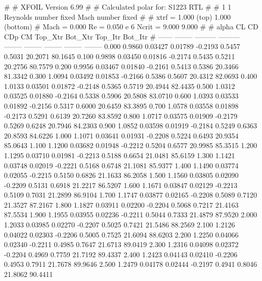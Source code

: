 #  
#       XFOIL         Version 6.99
#  
# Calculated polar for: S1223 RTL                                       
#  
# 1 1 Reynolds number fixed          Mach number fixed         
#  
# xtrf =   1.000 (top)        1.000 (bottom)  
# Mach =   0.000     Re =     0.050 e 6     Ncrit =   9.000  9.000
#  
#   alpha    CL        CD       CDp       CM     Top_Xtr  Bot_Xtr  Top_Itr  Bot_Itr
#  ------ -------- --------- --------- -------- -------- -------- -------- --------
   0.000   0.9860   0.03427   0.01789  -0.2193   0.5457   0.5031  20.2071  80.1645
   0.100   0.9898   0.03450   0.01816  -0.2174   0.5435   0.5211  20.2756  80.7579
   0.200   0.9956   0.03467   0.01840  -0.2161   0.5413   0.5386  20.3466  81.3342
   0.300   1.0094   0.03492   0.01853  -0.2166   0.5386   0.5607  20.4312  82.0693
   0.400   1.0133   0.03501   0.01872  -0.2148   0.5365   0.5719  20.4944  82.4435
   0.500   1.0312   0.03525   0.01880  -0.2164   0.5338   0.5906  20.5808  83.0710
   0.600   1.0393   0.03533   0.01892  -0.2156   0.5317   0.6000  20.6459  83.3895
   0.700   1.0578   0.03558   0.01898  -0.2173   0.5291   0.6139  20.7260  83.8592
   0.800   1.0717   0.03575   0.01909  -0.2179   0.5269   0.6248  20.7946  84.2303
   0.900   1.0852   0.03598   0.01919  -0.2184   0.5249   0.6363  20.8593  84.6226
   1.000   1.1071   0.03641   0.01931  -0.2208   0.5224   0.6493  20.9354  85.0643
   1.100   1.1200   0.03682   0.01948  -0.2212   0.5204   0.6577  20.9985  85.3515
   1.200   1.1295   0.03710   0.01981  -0.2213   0.5188   0.6654  21.0481  85.6159
   1.300   1.1421   0.03748   0.02019  -0.2221   0.5168   0.6748  21.1081  85.9377
   1.400   1.1490   0.03774   0.02055  -0.2215   0.5150   0.6826  21.1633  86.2058
   1.500   1.1560   0.03805   0.02090  -0.2209   0.5131   0.6918  21.2217  86.5207
   1.600   1.1671   0.03847   0.02129  -0.2213   0.5109   0.7031  21.2899  86.9104
   1.700   1.1747   0.03877   0.02165  -0.2208   0.5089   0.7120  21.3527  87.2167
   1.800   1.1827   0.03911   0.02200  -0.2204   0.5068   0.7217  21.4163  87.5534
   1.900   1.1955   0.03955   0.02236  -0.2211   0.5044   0.7333  21.4879  87.9520
   2.000   1.2033   0.03985   0.02270  -0.2207   0.5025   0.7421  21.5486  88.2569
   2.100   1.2126   0.04022   0.02303  -0.2206   0.5005   0.7525  21.6094  88.6203
   2.200   1.2250   0.04066   0.02340  -0.2211   0.4985   0.7647  21.6713  89.0419
   2.300   1.2316   0.04098   0.02372  -0.2204   0.4969   0.7759  21.7192  89.4337
   2.400   1.2423   0.04143   0.02410  -0.2206   0.4953   0.7911  21.7678  89.9646
   2.500   1.2479   0.04178   0.02444  -0.2197   0.4941   0.8046  21.8062  90.4411
